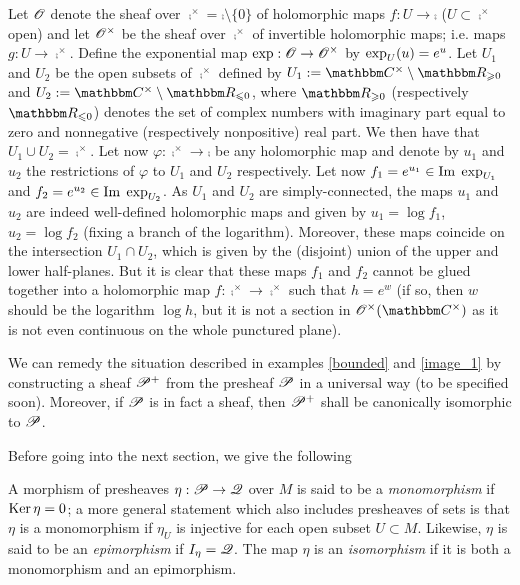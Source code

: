 \begin{ej}\label{image_1}
Let $\mathscr{O}$ denote the sheaf over $\comp^{\times}=\comp \setminus \{0\}$ of holomorphic maps $f:U\to \comp$ ($U\subset \comp^{\times}$ open) and let $\mathscr{O}^{\times}$ be the sheaf over $\comp^{\times}$ of invertible holomorphic maps; i.e. maps $g:U\to \comp^{\times}$. Define the exponential map $\operatorname{exp}:\mathscr{O}\to \mathscr{O}^{\times}$ by $\operatorname{exp}_U(u)=e^u$. Let $U_1$ and $U_2$ be the open subsets of $\comp^{\times}$ defined by $U_1:=\comp^{\times}\setminus \re_{\geqslant 0}$ and $U_2:=\comp^{\times}\setminus \re_{\leqslant0}$, where $\re_{\geqslant 0}$ (respectively $\re_{\leqslant 0}$) denotes the set of complex numbers with imaginary part equal to zero and nonnegative (respectively nonpositive) real part. We then have that $U_1\cup U_2=\comp^{\times}$. Let now $\varphi :\comp^\times \to \comp$ be any holomorphic map and denote by $u_1$ and $u_2$ the restrictions of $\varphi$ to $U_1$ and $U_2$ respectively. Let now $f_1=e^{u_1}\in \operatorname{Im}\; \operatorname{exp}_{U_1}$ and $f_2=e^{u_2}\in \operatorname{Im}\; \operatorname{exp}_{U_2}$. As $U_1$ and $U_2$ are simply-connected, the maps $u_1$ and $u_2$ are indeed well-defined holomorphic maps and given by $u_1=\log f_1$, $u_2=\log f_2$ (fixing a branch of the logarithm). Moreover, these maps coincide on the intersection $U_1\cap U_2$, which is given by the (disjoint) union of the upper and lower half-planes. But it is clear that these maps $f_1$ and $f_2$ cannot be glued together into a holomorphic map $f:\comp^{\times}\to \comp^{\times}$ such that $h=e^w$ (if so, then $w$ should be the logarithm $\log h$, but it is not a section in $\scr{O}^{\times}(\comp^{\times})$ as it is not even continuous on the whole punctured plane).
\end{ej}

We can remedy the situation described in examples \ref{bounded} and \ref{image_1} by constructing a sheaf $\mathscr{P}^+$ from the presheaf $\mathscr{P}$ in a universal way (to be specified soon). Moreover, if $\mathscr{P}$ is in fact a sheaf, then $\mathscr{P}^+$ shall be canonically isomorphic to $\mathscr{P}$.

Before going into the next section, we give the following

\begin{defi}
A morphism of presheaves $\eta :\mathscr{P}\to \mathscr{Q}$ over $M$ is said to be a \emph{monomorphism} if $\operatorname{Ker}\eta =0$; a more general statement which also includes presheaves of sets is that $\eta$ is a monomorphism if $\eta_U$ is injective for each open subset $U\subset M$. Likewise, $\eta$ is said to be an \emph{epimorphism} if $I_{\eta}=\mathscr{Q}$. The map $\eta$ is an \emph{isomorphism} if it is both a monomorphism and an epimorphism.
\end{defi}

